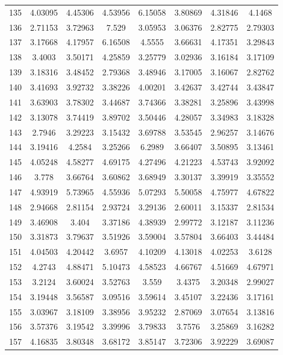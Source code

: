 \begin{figure}
\begin{tabular}{cccccccc}
135 & 4.03095 & 4.45306 & 4.53956 & 6.15058 & 3.80869 & 4.31846 & 4.1468\\
136 & 2.71153 & 3.72963 & 7.529 & 3.05953 & 3.06376 & 2.82775 & 2.79303\\
137 & 3.17668 & 4.17957 & 6.16508 & 4.5555 & 3.66631 & 4.17351 & 3.29843\\
138 & 3.4003 & 3.50171 & 4.25859 & 3.25779 & 3.02936 & 3.16184 & 3.17109\\
139 & 3.18316 & 3.48452 & 2.79368 & 3.48946 & 3.17005 & 3.16067 & 2.82762\\
140 & 3.41693 & 3.92732 & 3.38226 & 4.00201 & 3.42637 & 3.42744 & 3.43847\\
141 & 3.63903 & 3.78302 & 3.44687 & 3.74366 & 3.38281 & 3.25896 & 3.43998\\
142 & 3.13078 & 3.74419 & 3.89702 & 3.50446 & 4.28057 & 3.34983 & 3.18328\\
143 & 2.7946 & 3.29223 & 3.15432 & 3.69788 & 3.53545 & 2.96257 & 3.14676\\
144 & 3.19416 & 4.2584 & 3.25266 & 6.2989 & 3.66407 & 3.50895 & 3.13461\\
145 & 4.05248 & 4.58277 & 4.69175 & 4.27496 & 4.21223 & 4.53743 & 3.92092\\
146 & 3.778 & 3.66764 & 3.60862 & 3.68949 & 3.30137 & 3.39919 & 3.35552\\
147 & 4.93919 & 5.73965 & 4.55936 & 5.07293 & 5.50058 & 4.75977 & 4.67822\\
148 & 2.94668 & 2.81154 & 2.93724 & 3.29136 & 2.60011 & 3.15337 & 2.81534\\
149 & 3.46908 & 3.404 & 3.37186 & 4.38939 & 2.99772 & 3.12187 & 3.11236\\
150 & 3.31873 & 3.79637 & 3.51926 & 3.59004 & 3.57804 & 3.66403 & 3.44484\\
151 & 4.04503 & 4.20442 & 3.6957 & 4.10209 & 4.13018 & 4.02253 & 3.6128\\
152 & 4.2743 & 4.88471 & 5.10473 & 4.58523 & 4.66767 & 4.51669 & 4.67971\\
153 & 3.2124 & 3.60024 & 3.52763 & 3.559 & 3.4375 & 3.20348 & 2.99027\\
154 & 3.19448 & 3.56587 & 3.09516 & 3.59614 & 3.45107 & 3.22436 & 3.17161\\
155 & 3.03967 & 3.18109 & 3.38956 & 3.95232 & 2.87069 & 3.07654 & 3.13816\\
156 & 3.57376 & 3.19542 & 3.39996 & 3.79833 & 3.7576 & 3.25869 & 3.16282\\
157 & 4.16835 & 3.80348 & 3.68172 & 3.85147 & 3.72306 & 3.92229 & 3.69087\\

\end{tabular}
\end{figure}
